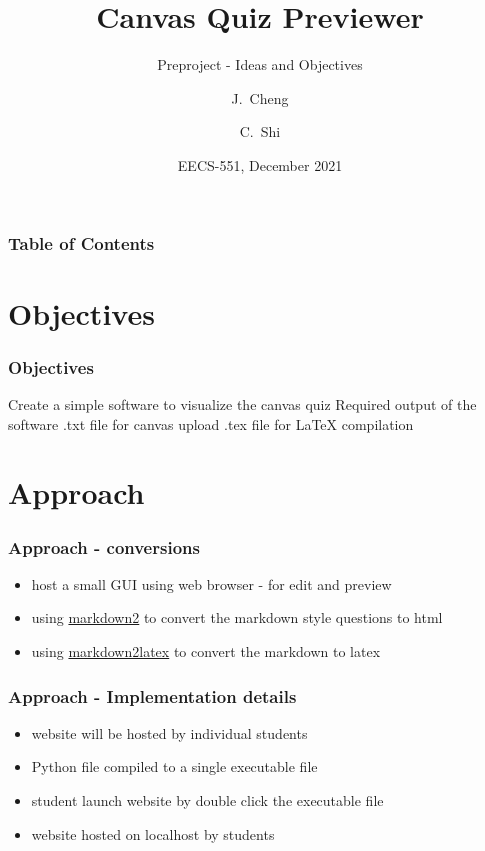 \documentclass[17pt]{beamer}
\title[Preproject Presentation] %
{Canvas Quiz Previewer}
\subtitle{Preproject - Ideas and Objectives}
\author[Cheng, Shi] %
{J.~Cheng\inst{1} \and C.~Shi\inst{1}}
\institute[U Mich] %
{
  \inst{1}%
  Graduate Students\\
  Department of ECE\\
  University of Michigan
}
\date[\today] %
{EECS-551, December 2021}
\begin{document}
\frame{\titlepage}

\begin{frame}
    \frametitle{Table of Contents}
    \tableofcontents
\end{frame}

\section{Objectives}
\begin{frame}
    \frametitle{Objectives}
    \begin{outline}
        \1 Create a simple software to visualize the canvas quiz
        \1 Required output of the software
            \2 .txt file for canvas upload
            \2 .tex file for \LaTeX \: compilation
    \end{outline}
\end{frame}

\section{Approach}
\begin{frame}
    \frametitle{Approach - conversions}
    \begin{itemize}
        \item host a small GUI using web browser - for edit and preview
        \item using \href{https://github.com/trentm/python-markdown2}{markdown2} to convert the markdown style questions to html
        \item using \href{https://github.com/rufuspollock/markdown2latex}{markdown2latex} to convert the markdown to latex
        
    \end{itemize}
\end{frame}

\begin{frame}
    \frametitle{Approach - Implementation details}
    \begin{itemize}
        \item website will be hosted by individual students 
        \item Python file compiled to a single executable file
        \item student launch website by double click the executable file
        \item website hosted on localhost by students
    \end{itemize}
\end{frame}
\end{document}

